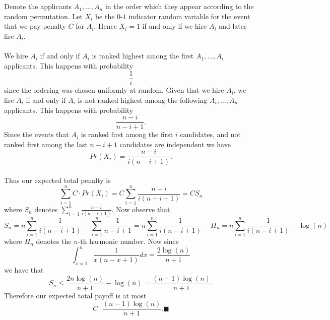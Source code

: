 \documentclass[letterpaper,12pt,oneside,onecolumn]{article}
\begin{document}
\section{}
\paragraph{}
Denote the applicants $A_1, \dots, A_n$ in the order which they appear according to the random permutation. Let $X_i$ be the $0$-$1$ indicator random variable for the event that we pay penalty $C$ for  $A_i$. Hence $X_i=1$ if and only if we hire $A_i$ and later fire $A_i$.
\paragraph{}
We hire $A_i$ if and only if $A_i$ is ranked highest among the first $A_1, \dots, A_i$ applicants. This happens with probability
$$\frac{1}{i}$$
since the ordering was chosen uniformly at random. Given that we hire $A_i$, we fire $A_i$ if and only if $A_i$ is not ranked highest among the following $A_i, \dots, A_n$ applicants. This happens with probability
$$\frac{n-i}{n-i+1}.$$
Since the events that $A_i$ is ranked first among the first $i$ candidates, and not ranked first among the last $n-i+1$ candidates are independent we have
$$Pr(X_i) = \frac{n-i}{i(n-i+1)}.$$
\paragraph{}
Thus our expected total penalty is
$$\sum_{i=1}^n C\cdot Pr(X_i) = C \sum_{i=1}^n\frac{n-i}{i(n-i+1)} = CS_n$$
where $S_n$ denotes $\sum_{i=1}^n\frac{n-i}{i(n-i+1)}$. Now observe that
$$S_n = n\sum_{i=1}^n\frac{1}{i(n-i+1)} - \sum_{i=1}^n\frac{1}{n-i+1}= n\sum_{i=1}^n\frac{1}{i(n-i+1)} - H_n =  n\sum_{i=1}^n\frac{1}{i(n-i+1)} - \log(n)$$
where $H_n$ denotes the $n$-th harmonic number. Now since
$$\int_{x=1}^n \frac{1}{x(n-x+1)} dx = \frac{2\log(n)}{n+1}$$
we have that
$$S_n \leq \frac{2n\log(n)}{n+1} -\log(n) = \frac{(n-1)\log(n)}{n+1}.$$
Therefore our expected total payoff is at most
$$C\cdot \frac{(n-1)\log(n)}{n+1}. \blacksquare$$
\newpage
\end{document}
